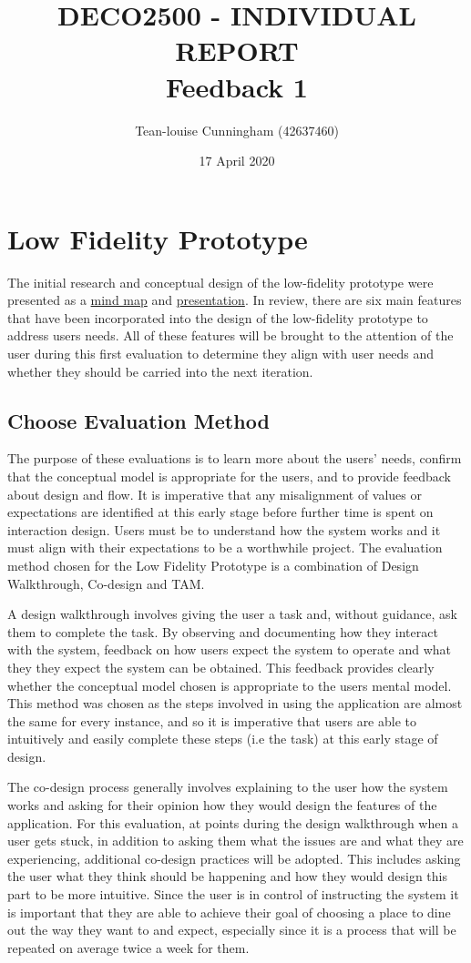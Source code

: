 \documentclass[a4 paper, 12pt]{article}
\title{DECO2500 - INDIVIDUAL REPORT \\ Feedback 1}
\author{Tean-louise Cunningham (42637460)}
\date{17 April 2020}
\begin{document}
\section{Low Fidelity Prototype}
The initial research and conceptual design of the low-fidelity prototype were presented as a \href{run:./MindMap.pdf}{mind map} and \href{https://youtu.be/BRX7kF7ynSQ}{presentation}. In review, there are six main features that have been incorporated into the design of the low-fidelity prototype to address users needs. All of these features will be brought to the attention of the user during this first evaluation to determine they align with user needs and whether they should be carried into the next iteration.

\subsection{Choose Evaluation Method}
The purpose of these evaluations is to learn more about the users' needs, confirm that the conceptual model is appropriate for the users, and to provide feedback about design and flow. It is imperative that any misalignment of values or expectations are identified at this early stage before further time is spent on interaction design. Users must be to understand how the system works and it must align with their expectations to be a worthwhile project. The evaluation method chosen for the Low Fidelity Prototype is a combination of Design Walkthrough, Co-design and TAM.

A design walkthrough involves giving the user a task and, without guidance, ask them to complete the task. By observing and documenting how they interact with the system, feedback on how users expect the system to operate and what they they expect the system can be obtained. This feedback provides clearly whether the conceptual model chosen is appropriate to the users mental model. This method was chosen as the steps involved in using the application are almost the same for every instance, and so it is imperative that users are able to intuitively and easily complete these steps (i.e the task) at this early stage of design.

The co-design process generally involves explaining to the user how the system works and asking for their opinion how they would design the features of the application. For this evaluation, at points during the design walkthrough when a user gets stuck, in addition to asking them what the issues are and what they are experiencing, additional co-design practices will be adopted. This includes asking the user what they think should be happening and how they would design this part to be more intuitive. Since the user is in control of instructing the system it is important that they are able to achieve their goal of choosing a place to dine out the way they want to and expect, especially since it is a process that will be repeated on average twice a week for them. 
\end{document}

